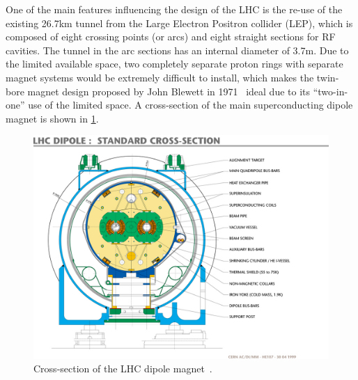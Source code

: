 One of the main features influencing the design of the LHC is the re-use of the
existing 26.7\unit{km} tunnel from the Large Electron Positron collider (LEP), which is
composed of eight crossing points (or arcs) and eight straight sections for
RF cavities. The tunnel in the arc sections has an internal diameter of 3.7\unit{m}. Due to the limited available space, two completely separate
proton rings with separate magnet systems would be extremely difficult to install, which makes the twin-bore magnet design proposed by John
Blewett in 1971~\cite{Blewett:1068131} ideal due to its
``two-in-one'' use of the limited space. A cross-section of the main superconducting
dipole magnet is shown in \ref{fig:LHCDipole}.

\begin{figure}\centering
\includegraphics[width=.9\textwidth,clip=true,viewport=0 20 680 550]{figs/cms/lhc-pho-1999-172.jpg}
\caption{Cross-section of the LHC dipole magnet~\cite{LHCMachine}.\label{fig:LHCDipole}}
\end{figure}

